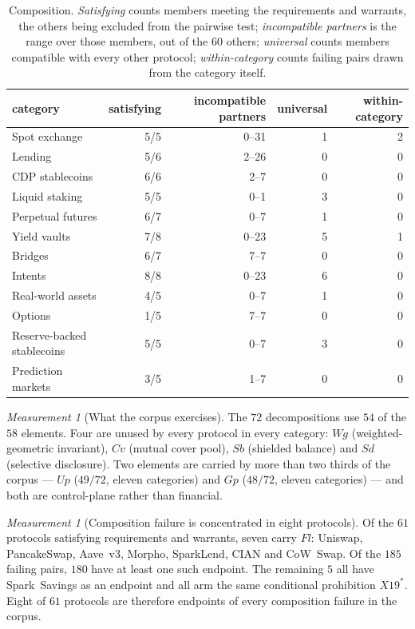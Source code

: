 \documentclass[11pt,reqno]{amsart}
\theoremstyle{plain}
\theoremstyle{definition}
\theoremstyle{remark}
\newtheorem{measurement}[theorem]{Measurement}
\begin{document}
\begin{table}[t]\centering\small
\begin{tabular}{lrrrr}
\toprule
category & satisfying & incompatible partners & universal & within-category \\
\midrule
Spot exchange & 5/5 & 0--31 & 1 & 2 \\
Lending & 5/6 & 2--26 & 0 & 0 \\
CDP stablecoins & 6/6 & 2--7 & 0 & 0 \\
Liquid staking & 5/5 & 0--1 & 3 & 0 \\
Perpetual futures & 6/7 & 0--7 & 1 & 0 \\
Yield vaults & 7/8 & 0--23 & 5 & 1 \\
Bridges & 6/7 & 7--7 & 0 & 0 \\
Intents & 8/8 & 0--23 & 6 & 0 \\
Real-world assets & 4/5 & 0--7 & 1 & 0 \\
Options & 1/5 & 7--7 & 0 & 0 \\
Reserve-backed stablecoins & 5/5 & 0--7 & 3 & 0 \\
Prediction markets & 3/5 & 1--7 & 0 & 0 \\
\bottomrule
\end{tabular}
\caption{Composition. \emph{Satisfying} counts members meeting the requirements
and warrants, the others being excluded from the pairwise test;
\emph{incompatible partners} is the range over those members, out of the $60$
others; \emph{universal} counts members compatible with every other protocol;
\emph{within-category} counts failing pairs drawn from the category itself.}
\label{tab:composition}
\end{table}

\begin{measurement}[What the corpus exercises]\label{meas:cat:usage}
The $72$ decompositions use $54$ of the $58$ elements. Four are unused by every
protocol in every category: $Wg$ (weighted-geometric invariant), $Cv$ (mutual
cover pool), $Sb$ (shielded balance) and $Sd$ (selective disclosure). Two
elements are carried by more than two thirds of the corpus --- $Up$ ($49/72$,
eleven categories) and $Gp$ ($48/72$, eleven categories) --- and both are
control-plane rather than financial.
\end{measurement}

\begin{measurement}[Composition failure is concentrated in eight protocols]\label{meas:cat:eight}
Of the $61$ protocols satisfying requirements and warrants, seven carry $Fl$:
Uniswap, PancakeSwap, Aave~v3, Morpho, SparkLend, CIAN and CoW~Swap. Of the
$185$ failing pairs, $180$ have at least one such endpoint. The remaining $5$
all have Spark~Savings as an endpoint and all arm the same conditional
prohibition $X19^{*}$. Eight of $61$ protocols are therefore endpoints of every
composition failure in the corpus.
\end{measurement}
\end{document}
